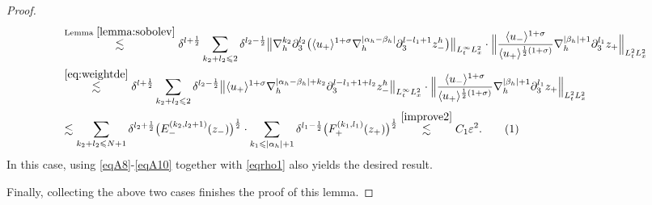 \documentclass[10pt,reqno]{amsart}
\numberwithin{equation}{section}
\begin{document}
\begin{proof}
\begin{align*}
&\stackrel{\text{Lemma } \ref{lemma:sobolev}}{\lesssim}\delta^{l+\frac{1}{2}}
\sum_{k_2+l_2\leqslant 2}\delta^{l_2-\frac{1}{2}}\big\|\nabla_h^{k_2}\partial_3^{l_2}\big(\langle u_+\rangle^{1+\sigma}\nabla_h^{|\alpha_h-\beta_h|}\partial_3^{l-l_1+1}z_-^h\big)\big\|_{L^\infty_tL^2_x}\cdot \Big\|\frac{\langle u_-\rangle^{1+\sigma}}{\langle u_+\rangle^{\frac{1}{2}(1+\sigma)}}\nabla_h^{|\beta_h|+1}\partial_3^{l_1}z_+\Big\|_{L^2_tL^2_x}\\
&\stackrel{\eqref{eq:weightde}}{\lesssim}\delta^{l+\frac{1}{2}}\sum_{k_2+l_2\leqslant 2}\delta^{l_2-\frac{1}{2}}\big\|\langle u_+\rangle^{1+\sigma}\nabla_h^{|\alpha_h-\beta_h|+k_2}\partial_3^{l-l_1+1+l_2}z_-^h\big\|_{L^\infty_tL^2_x}\cdot \Big\|\frac{\langle u_-\rangle^{1+\sigma}}{\langle u_+\rangle^{\frac{1}{2}(1+\sigma)}}\nabla_h^{|\beta_h|+1}\partial_3^{l_1}z_+\Big\|_{L^2_tL^2_x}\\
&\lesssim	
\sum_{k_2+l_2\leqslant N+1}\delta^{l_2+\frac{1}{2}}\big(E_-^{(k_2,l_2+1)}(z_-)\big)^{\frac{1}{2}}\cdot\sum_{k_1\leqslant|\alpha_h|+1}\delta^{l_1-\frac{1}{2}}\big(F_+^{(k_1,l_1)}(z_+)\big)^{\frac{1}{2}}
\stackrel{\eqref{improve2}}{\lesssim} C_1\varepsilon^2.\stepcounter{equation}\tag{\theequation}\label{eqA10}
\end{align*}
In this case, using \eqref{eqA8}-\eqref{eqA10} together with \eqref{eqrho1} also yields the desired result. 


Finally, collecting the above two cases finishes the proof of this lemma. 
\end{proof}

 
\end{document}

